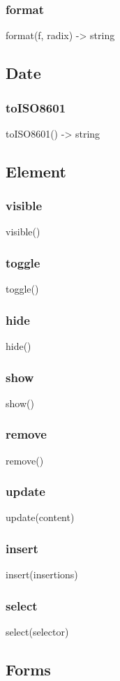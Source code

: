 {{{{{{{{\subsubsection*{format}
format(f, radix) -> string

\subsection{Date}
\subsubsection*{toISO8601}
toISO8601() -> string

\subsection{Element}
\subsubsection*{visible}
visible() {
\subsubsection*{toggle}
toggle() {
\subsubsection*{hide}
hide() {
\subsubsection*{show}
show() {
\subsubsection*{remove}
remove() {
\subsubsection*{update}
update(content) {
\subsubsection*{insert}
insert(insertions) {
\subsubsection*{select}
select(selector) {

\subsection{Forms}
}}}}}}}}}}}}}}}}
